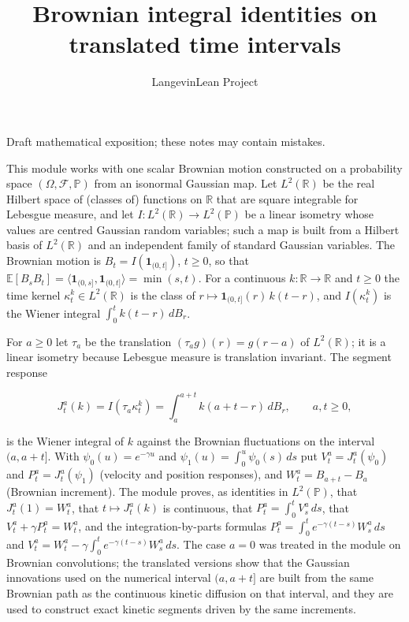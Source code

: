\documentclass[11pt,a4paper]{article}
\title{\texorpdfstring{Brownian integral identities on translated time intervals}{Brownian integral identities on translated time intervals}}
\author{LangevinLean Project}
\date{}
\begin{document}
\maketitle
Draft mathematical exposition; these notes may contain mistakes.


This module works with one scalar Brownian motion constructed on a probability space \((\Omega,\mathcal F,\mathbb P)\) from an isonormal Gaussian map. Let \(L^2(\mathbb R)\) be the real Hilbert space of (classes of) functions on \(\mathbb R\) that are square integrable for Lebesgue measure, and let \(I:L^2(\mathbb R)\to L^2(\mathbb P)\) be a linear isometry whose values are centred Gaussian random variables; such a map is built from a Hilbert basis of \(L^2(\mathbb R)\) and an independent family of standard Gaussian variables. The Brownian motion is \(B_t=I(\mathbf 1_{(0,t]})\), \(t\ge0\), so that \(\mathbb E[B_sB_t]=\langle\mathbf 1_{(0,s]},\mathbf 1_{(0,t]}\rangle=\min(s,t)\). For a continuous \(k:\mathbb R\to\mathbb R\) and \(t\ge0\) the time kernel \(\kappa^k_t\in L^2(\mathbb R)\) is the class of \(r\mapsto\mathbf 1_{(0,t]}(r)\,k(t-r)\), and \(I(\kappa^k_t)\) is the Wiener integral \(\int_0^tk(t-r)\,dB_r\).




For \(a\ge0\) let \(\tau_a\) be the translation \((\tau_ag)(r)=g(r-a)\) of \(L^2(\mathbb R)\); it is a linear isometry because Lebesgue measure is translation invariant. The segment response


\[J^a_t(k)=I(\tau_a\kappa^k_t)=\int_a^{a+t}k(a+t-r)\,dB_r,\qquad a,t\ge0,\]


is the Wiener integral of \(k\) against the Brownian fluctuations on the interval \((a,a+t]\). With \(\psi_0(u)=e^{-\gamma u}\) and \(\psi_1(u)=\int_0^u\psi_0(s)\,ds\) put \(V^a_t=J^a_t(\psi_0)\) and \(P^a_t=J^a_t(\psi_1)\) (velocity and position responses), and \(W^a_t=B_{a+t}-B_a\) (Brownian increment). The module proves, as identities in \(L^2(\mathbb P)\), that \(J^a_t(1)=W^a_t\), that \(t\mapsto J^a_t(k)\) is continuous, that \(P^a_t=\int_0^tV^a_s\,ds\), that \(V^a_t+\gamma P^a_t=W^a_t\), and the integration-by-parts formulas \(P^a_t=\int_0^te^{-\gamma(t-s)}W^a_s\,ds\) and \(V^a_t=W^a_t-\gamma\int_0^te^{-\gamma(t-s)}W^a_s\,ds\). The case \(a=0\) was treated in the module on Brownian convolutions; the translated versions show that the Gaussian innovations used on the numerical interval \((a,a+t]\) are built from the same Brownian path as the continuous kinetic diffusion on that interval, and they are used to construct exact kinetic segments driven by the same increments.
\end{document}
